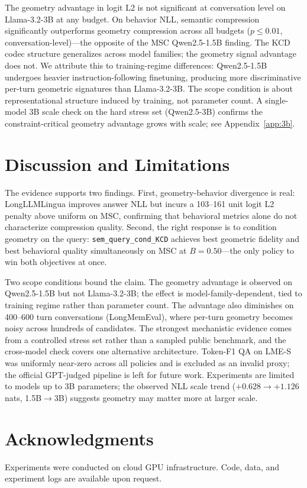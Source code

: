 \documentclass[11pt]{article}
\newcommand{\pname}[1]{\texttt{\small #1}}
\begin{document}
The geometry advantage in logit L2 is not significant at conversation level on Llama-3.2-3B at any budget. On behavior NLL, semantic compression significantly outperforms geometry compression across all budgets ($p\le0.01$, conversation-level)---the opposite of the MSC Qwen2.5-1.5B finding. The KCD codec structure generalizes across model families; the geometry signal advantage does not. We attribute this to training-regime differences: Qwen2.5-1.5B undergoes heavier instruction-following finetuning, producing more discriminative per-turn geometric signatures than Llama-3.2-3B. The scope condition is about representational structure induced by training, not parameter count. A single-model 3B scale check on the hard stress set (Qwen2.5-3B) confirms the constraint-critical geometry advantage grows with scale; see Appendix~\ref{app:3b}.

\section{Discussion and Limitations}
The evidence supports two findings. First, geometry-behavior divergence is real: LongLLMLingua improves answer NLL but incurs a 103--161 unit logit L2 penalty above uniform on MSC, confirming that behavioral metrics alone do not characterize compression quality. Second, the right response is to condition geometry on the query: \pname{sem\_query\_cond\_KCD} achieves best geometric fidelity and best behavioral quality simultaneously on MSC at $B{=}0.50$---the only policy to win both objectives at once.

Two scope conditions bound the claim. The geometry advantage is observed on Qwen2.5-1.5B but not Llama-3.2-3B; the effect is model-family-dependent, tied to training regime rather than parameter count. The advantage also diminishes on 400--600 turn conversations (LongMemEval), where per-turn geometry becomes noisy across hundreds of candidates. The strongest mechanistic evidence comes from a controlled stress set rather than a sampled public benchmark, and the cross-model check covers one alternative architecture. Token-F1 QA on LME-S was uniformly near-zero across all policies and is excluded as an invalid proxy; the official GPT-judged pipeline is left for future work. Experiments are limited to models up to 3B parameters; the observed NLL scale trend ($+0.628\to+1.126$ nats, 1.5B$\to$3B) suggests geometry may matter more at larger scale.

\section*{Acknowledgments}
Experiments were conducted on cloud GPU infrastructure. Code, data, and experiment logs are available upon request.
\end{document}

